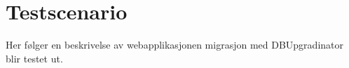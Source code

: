 \section{Testscenario}

Her følger en beskrivelse av webapplikasjonen migrasjon med DBUpgradinator blir testet ut. 
